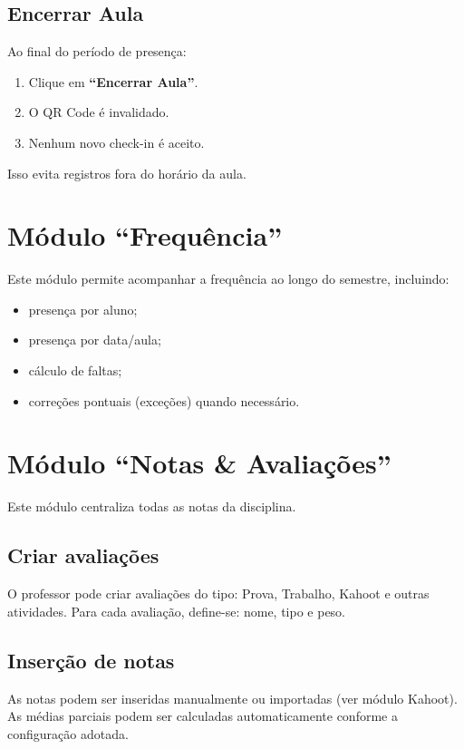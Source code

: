 \documentclass[12pt,a4paper]{article}
\begin{document}
\subsection{Encerrar Aula}
Ao final do período de presença:
\begin{enumerate}[label=\arabic*)]
  \item Clique em \textbf{``Encerrar Aula''}.
  \item O QR Code é invalidado.
  \item Nenhum novo check-in é aceito.
\end{enumerate}
Isso evita registros fora do horário da aula.

\section{Módulo ``Frequência''}
Este módulo permite acompanhar a frequência ao longo do semestre, incluindo:
\begin{itemize}[noitemsep]
  \item presença por aluno;
  \item presença por data/aula;
  \item cálculo de faltas;
  \item correções pontuais (exceções) quando necessário.
\end{itemize}

\section{Módulo ``Notas \& Avaliações''}
Este módulo centraliza todas as notas da disciplina.

\subsection{Criar avaliações}
O professor pode criar avaliações do tipo: Prova, Trabalho, Kahoot e outras atividades. Para cada avaliação, define-se: nome, tipo e peso.

\subsection{Inserção de notas}
As notas podem ser inseridas manualmente ou importadas (ver módulo Kahoot). As médias parciais podem ser calculadas automaticamente conforme a configuração adotada.
\end{document}
